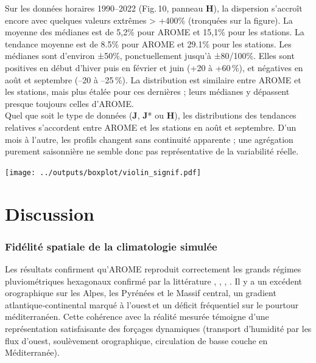 \documentclass[
  article,
  nofooter,
  noheadings]{jss}
\begin{document}
Sur les données horaires 1990--2022 (Fig.\,10, panneau \textbf{H}), la
dispersion s'accroît encore avec quelques valeurs extrêmes
\textgreater{} +400\% (tronquées sur la figure). La moyenne des médianes
est de 5,2\% pour AROME et 15,1\% pour les stations. La tendance moyenne
est de 8.5\% pour AROME et 29.1\% pour les stations. Les médianes sont
d'environ ±50\%, ponctuellement jusqu'à ±80/100\%. Elles sont positives
en début d'hiver puis en février et juin (+20 à +60\,\%), et négatives
en août et septembre (--20 à --25\,\%). La distribution est similaire
entre AROME et les stations, mais plus étalée pour ces dernières ; leurs
médianes y dépassent presque toujours celles d'AROME.\\

Quel que soit le type de données (\textbf{J}, \textbf{J}* ou
\textbf{H}), les distributions des tendances relatives s'accordent entre
AROME et les stations en août et septembre. D'un mois à l'autre, les
profils changent sans continuité apparente ; une agrégation purement
saisonnière ne semble donc pas représentative de la variabilité réelle.

\texttt{[image: ../outputs/boxplot/violin\_signif.pdf]}


\section{Discussion}\label{discussion}

\subsubsection{Fidélité spatiale de la climatologie
simulée}\label{fiduxe9lituxe9-spatiale-de-la-climatologie-simuluxe9e}

Les résultats confirment qu'AROME reproduit correctement les grands
régimes pluviométriques hexagonaux confirmé par la littérature
\citep{Fumiere2020}, \citep{caillaud2021simulation},
\citep{hess-28-2579-2024}, \citep{LucasPicher2024}. Il y a un excédent
orographique sur les Alpes, les Pyrénées et le Massif central, un
gradient atlantique‑continental marqué à l'ouest\,et un déficit
fréquentiel sur le pourtour méditerranéen. Cette cohérence avec la
réalité mesurée témoigne d'une représentation satisfaisante des forçages
dynamiques (transport d'humidité par les flux d'ouest, soulèvement
orographique, circulation de basse couche en Méditerranée).
\end{document}
